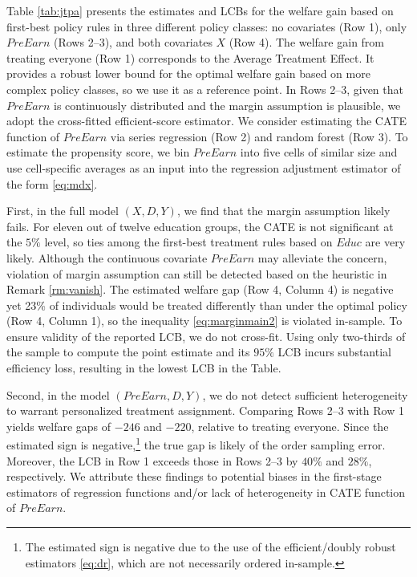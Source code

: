 \documentclass[12pt]{article}
\numberwithin{equation}{section}
\theoremstyle{plain}                         %
\theoremstyle{definition}                  %
\theoremstyle{remark}                      %
\begin{document}
Table \ref{tab:jtpa} presents the estimates and LCBs for the welfare gain based on first-best policy rules in three different policy classes: no covariates (Row 1), only $PreEarn$ (Rows 2--3), and both covariates $X$ (Row 4). The welfare gain from treating everyone (Row 1) corresponds to the Average Treatment Effect. It provides a robust lower bound for the optimal welfare gain based on more complex policy classes, so we use it as a reference point. In Rows 2--3, given that $PreEarn$ is continuously distributed and the margin assumption is plausible, we adopt the cross-fitted efficient-score estimator. We consider estimating the CATE function of $PreEarn$ via series regression (Row 2) and random forest (Row 3). To estimate the propensity score, we bin $PreEarn$ into five cells of similar size and use cell-specific averages as an input into the regression adjustment estimator of the form \eqref{eq:mdx}. 



First, in the full model $(X, D, Y)$, we find that the margin assumption likely fails. For eleven out of twelve education groups, the CATE is not significant at the $5\%$ level, so ties among the first-best treatment rules based on $Educ$ are very likely. Although the continuous covariate $PreEarn$ may alleviate the concern, violation of margin assumption can still be detected based on the heuristic in Remark \ref{rm:vanish}. The estimated welfare gap (Row 4, Column 4) is negative yet 23\% of individuals would be treated differently than under the optimal policy (Row 4, Column 1), so the inequality \eqref{eq:marginmain2} is violated in-sample. To ensure validity of the reported LCB, we do not cross-fit. Using only two-thirds of the sample to compute the point estimate and its $95\%$ LCB incurs substantial efficiency loss, resulting in the lowest LCB in the Table. 

Second, in the model $(PreEarn, D,Y)$, we do not detect sufficient heterogeneity to warrant personalized treatment assignment. Comparing Rows 2--3 with Row 1 yields welfare gaps of $-246$ and $-220$, relative to treating everyone. Since the estimated sign is negative,\footnote{ The estimated sign is negative due to the use of the efficient/doubly robust estimators \eqref{eq:dr}, which are not necessarily ordered in-sample.} the true gap is likely of the order sampling error. Moreover, the LCB in Row 1 exceeds those in Rows 2--3 by $40\%$ and $28\%$, respectively. We attribute these findings to potential biases in the first-stage estimators of regression functions and/or lack of heterogeneity in CATE function of $PreEarn$.
\end{document}
